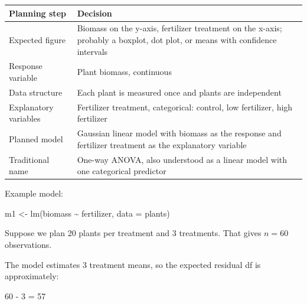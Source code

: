 \documentclass[
  letterpaper,
  8pt,
  a4paper]{book}
\newenvironment{Shaded}{\begin{snugshade}}{\end{snugshade}}
\newcommand{\AttributeTok}[1]{\textcolor[rgb]{0.40,0.45,0.13}{#1}}
\newcommand{\FunctionTok}[1]{\textcolor[rgb]{0.28,0.35,0.67}{#1}}
\newcommand{\NormalTok}[1]{\textcolor[rgb]{0.00,0.23,0.31}{#1}}
\newcommand{\OtherTok}[1]{\textcolor[rgb]{0.00,0.23,0.31}{#1}}
\newcommand{\SpecialCharTok}[1]{\textcolor[rgb]{0.37,0.37,0.37}{#1}}
\newcounter{none} %
\begin{document}
{\def\LTcaptype{none} %
\begin{longtable}[]{@{}
  >{\raggedright\arraybackslash}p{}
  >{\raggedright\arraybackslash}p{}@{}}
\toprule\noalign{}
\begin{minipage}[b]{\linewidth}\raggedright
Planning step
\end{minipage} & \begin{minipage}[b]{\linewidth}\raggedright
Decision
\end{minipage} \\
\midrule\noalign{}
\endhead
\bottomrule\noalign{}
\endlastfoot
Expected figure & Biomass on the y-axis, fertilizer treatment on the
x-axis; probably a boxplot, dot plot, or means with confidence
intervals \\
Response variable & Plant biomass, continuous \\
Data structure & Each plant is measured once and plants are
independent \\
Explanatory variables & Fertilizer treatment, categorical: control, low
fertilizer, high fertilizer \\
Planned model & Gaussian linear model with biomass as the response and
fertilizer treatment as the explanatory variable \\
Traditional name & One-way ANOVA, also understood as a linear model with
one categorical predictor \\
\end{longtable}
}

Example model:

\begin{Shaded}
\begin{Highlighting}[]
\NormalTok{m1 }\OtherTok{\textless{}{-}} \FunctionTok{lm}\NormalTok{(biomass }\SpecialCharTok{\textasciitilde{}}\NormalTok{ fertilizer, }\AttributeTok{data =}\NormalTok{ plants)}
\end{Highlighting}
\end{Shaded}

Suppose we plan 20 plants per treatment and 3 treatments. That gives
\(n = 60\) observations.

The model estimates 3 treatment means, so the expected residual df is
approximately:

\begin{Shaded}
\begin{Highlighting}[]
\NormalTok{60 {-} 3 = 57}
\end{Highlighting}
\end{Shaded}
\end{document}
